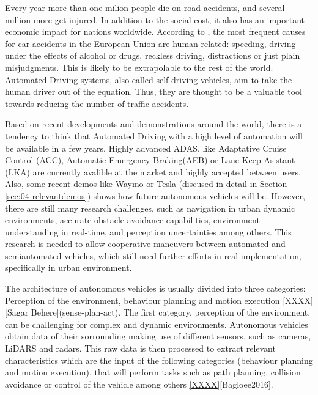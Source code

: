 Every year more than one milion people die on road accidents, and several 
million more get injured. In addition to the social cost, it also has an
important economic impact for nations worldwide. According to 
\cite{Thomas2013}, the most frequent causes for car accidents in the
European Union are human related: speeding, driving under the effects of
alcohol or drugs, reckless driving, distractions or just plain misjudgments.
This is likely to be extrapolable to the rest of the world.
Automated Driving systems, also called self-driving vehicles, aim to take the 
human driver out of the equation. Thus, they are thought to be a valuable tool
towards reducing the number of traffic accidents.

Based on recent developments and demonstrations around the world, there is a 
tendency to think that Automated Driving with a high level of automation will 
be available in a few years. 
Highly advanced ADAS, like Adaptative Cruise Control (ACC), Automatic Emergency
Braking(AEB) or Lane Keep Asistant (LKA) are currently avalible at the market 
and highly accepted between users. Also, some recent demos like Waymo or Tesla 
(discused in detail in Section \ref{sec:04-relevantdemos}) shows how future 
autonomous vehicles will be.
However, there are still many research challenges, such as navigation in urban 
dynamic environments, accurate obstacle avoidance capabilities, environment 
understanding in real-time, and perception uncertainties among others. This 
research is needed to allow cooperative maneuvers between automated and 
semiautomated vehicles, which still need further efforts in real 
implementation, specifically in urban environment.

The architecture of autonomous vehicles is usually divided into three 
categories: Perception of the environment, behaviour planning and motion 
execution \ref{XXXX}[Sagar Behere](sense-plan-act). The first category, 
perception of the environment, can be challenging for complex and dynamic 
environments. Autonomous vehicles obtain data of their sorrounding making use 
of different sensors, such as cameras, LiDARS and radars. This raw data is then 
processed to extract relevant characteristics which are the input of the 
following categories (behaviour planning and motion execution), that will 
perform tasks such as path planning, collision avoidance or control of the 
vehicle among others \ref{XXXX}[Bagloee2016].


